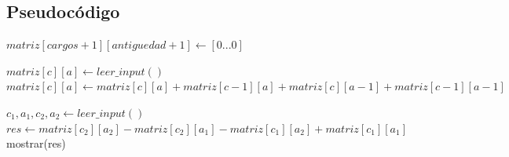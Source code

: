 \subsection {Pseudocódigo}

\begin{algorithmic}

	\State $matriz[cargos + 1][antiguedad + 1] \gets [0...0]$ 

			\State $matriz[c][a] \gets leer\_input()$
			\State $matriz[c][a] \gets matriz[c][a] + matriz[c - 1][a] + matriz[c][a - 1] + matriz[c - 1][a - 1]$
		\EndFor
	\EndFor

		\State $c_1, a_1, c_2, a_2 \gets leer\_input()$
		\State $res \gets matriz[c_2][a_2] - matriz[c_2][a_1] - matriz[c_1][a_2] + matriz[c_1][a_1]$
		\State mostrar(res)
	\EndFor

\end{algorithmic}
